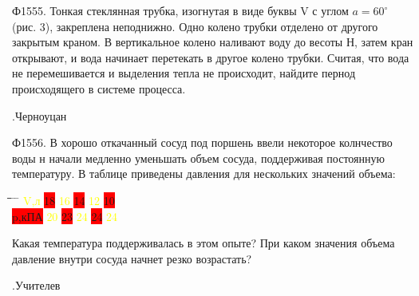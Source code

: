 \documentclass{article}
\begin{document}
{\begin{minipage}[t]{0.47\textwidth}
    Ф1555. Тонкая стеклянная трубка, изогнутая в виде буквы V с углом $a = 60^{\circ}$ (рис. 3), закреплена неподнижно. Одно колено трубки отделено от другого закрытым краном. В вертикальное колено наливают воду до весоты $Н$, затем кран открывают, и вода начинает перетекать в другое колено трубки. Считая, что вода не перемешивается и выделения тепла не происходит, найдите пернод происходящего в системе процесса.
    \begin{flushright}.Черноуцан\end{flushright}
    \upshape
    Ф1556. В хорошо откачанный сосуд под поршень ввели некоторое колнчество воды н начали медленно уменьшать объем сосуда, поддерживая постоянную температуру. В таблице приведены давления для нескольких значений объема:
    \begin{center}
      \parbox{0cm}{
        \begin{tabbing}
          \hspace{4em}\= \hspace{2em}\= \hspace{2em}\= \hspace{2em} \= \hspace{2em} \= \hspace{2em}\kill
          \textcolor{yellow}{V,л} \> \colorbox{red}{18} \> \textcolor{yellow}{16} \> \colorbox{red}{14} \> \textcolor{yellow}{12} \> \colorbox{red}{10}\\
          \colorbox{red}{p,кПА} \> \textcolor{yellow}{20} \> \colorbox{red}{23} \> \textcolor{yellow}{24} \> \colorbox{red}{24} \> \textcolor{yellow}{24}\\
        \end{tabbing}} 
    \end{center}
    \begin{spacing}{1.5}
      \hspace{1cm}  Какая температура поддерживалась в этом опыте? При каком значения объема давление внутри сосуда начнет резко возрастать?
     \end{spacing}
    \begin{flushright}.Учителев\end{flushright}
    \upshape


\end{minipage}}
\end{document}
